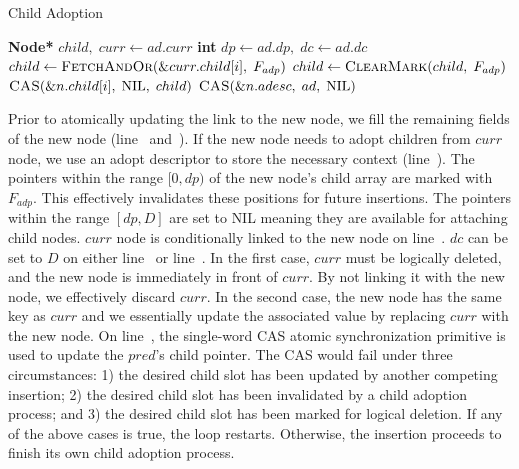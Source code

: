 \documentclass[10pt,conference,compsocconf]{IEEEtran}
\newcommand\NIL{\text{NIL}}
\begin{document}
\begin{algorithm}[t]
    \caption{Child Adoption}
    \label{alg:adoption}
    \begin{algorithmic}[1]
        \State \textbf{Node*} $child,\;curr \gets ad.curr$ 
        \State \textbf{int} $dp \gets ad.dp,\;dc \gets ad.dc$
        \For {$i \in [dp, dc)$} \label{l:adoptionfor}
        \State $child \gets \textsc{FetchAndOr}(\&curr.child[i],\;F_{adp})$ \label{l:setadp} 
        \State $child \gets \textsc{ClearMark}(child,\;F_{adp})$
        \If{$n.child[i] = \NIL$} \label{l:checkadopt}
        \State $\text{\textsc{CAS}}(\&n.child[i],\;\NIL,\;child)$ \label{l:adopt}
        \EndIf
        \EndFor
        \State $\text{\textsc{CAS}}(\&n.adesc,\;ad,\;\NIL)$
        \EndFunction
    \end{algorithmic}
\end{algorithm}


Prior to atomically updating the link to the new node, we fill the remaining fields of the new node (line~ and~).
If the new node needs to adopt children from $curr$ node, we use an adopt descriptor to store the necessary context (line~).
The pointers within the range $[0, dp)$ of the new node's child array are marked with $F_{adp}$.
This effectively invalidates these positions for future insertions.
The pointers within the range $[dp, D]$ are set to \textsc{NIL} meaning they are available for attaching child nodes.
$curr$ node is conditionally linked to the new node on line~.
$dc$ can be set to $D$ on either line~ or line~. 
In the first case, $curr$ must be logically deleted, and the new node is immediately in front of $curr$.
By not linking it with the new node, we effectively discard $curr$.
In the second case, the new node has the same key as $curr$ and we essentially update the associated value by replacing $curr$ with the new node. 
On line~, the single-word CAS atomic synchronization primitive is used to update the $pred$'s child pointer.
The CAS would fail under three circumstances: 1) the desired child slot has been updated by another competing insertion; 2) the desired child slot has been invalidated by a child adoption process; and 3) the desired child slot has been marked for logical deletion.
If any of the above cases is true, the loop restarts.
Otherwise, the insertion proceeds to finish its own child adoption process.
\end{document}
